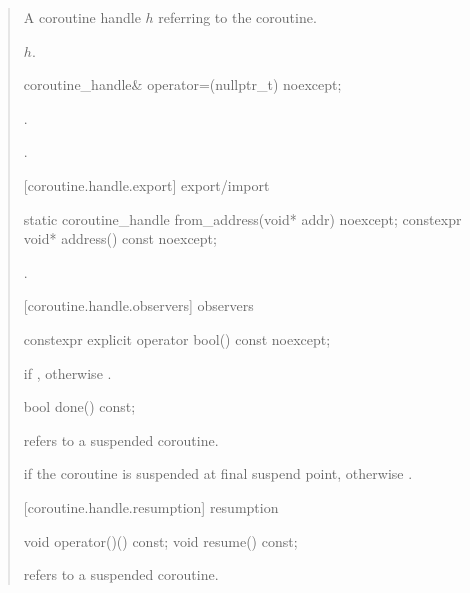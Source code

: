 \begin{quote}
\begin{itemdescr}
	\pnum
  \returns A coroutine handle $h$ referring to the coroutine.
  
  \pnum\postconditions {}$h$.
\end{itemdescr}

\begin{itemdecl}
  coroutine_handle& operator=(nullptr_t) noexcept;
\end{itemdecl}
\begin{itemdescr}
	\pnum\postconditions {}.
  
  \pnum\returns {}.
\end{itemdescr}

[coroutine.handle.export]{ export/import}
\begin{itemdecl}
  static coroutine_handle from_address(void* addr) noexcept;		
  constexpr void* address() const noexcept;
\end{itemdecl}

\begin{itemdescr}
  \pnum
  \postconditions {}.
\end{itemdescr}

[coroutine.handle.observers]{ observers}
\begin{itemdecl}
  constexpr explicit operator bool() const noexcept;
\end{itemdecl}

\begin{itemdescr}
  \pnum
  \returns {} if , otherwise .
\end{itemdescr}

\begin{itemdecl}
	bool done() const; 
\end{itemdecl}
\begin{itemdescr}
	\pnum
	\precondition {} refers to a suspended coroutine.
	
	\pnum
	\returns {} if the coroutine is suspended
	at final suspend point, otherwise .
\end{itemdescr}

[coroutine.handle.resumption]{ resumption}
\begin{itemdecl}
  void operator()() const;
  void resume() const;	
\end{itemdecl}
\begin{itemdescr}
  \pnum
  \precondition {} refers to a suspended coroutine.
  

\end{itemdescr}
\end{quote}
